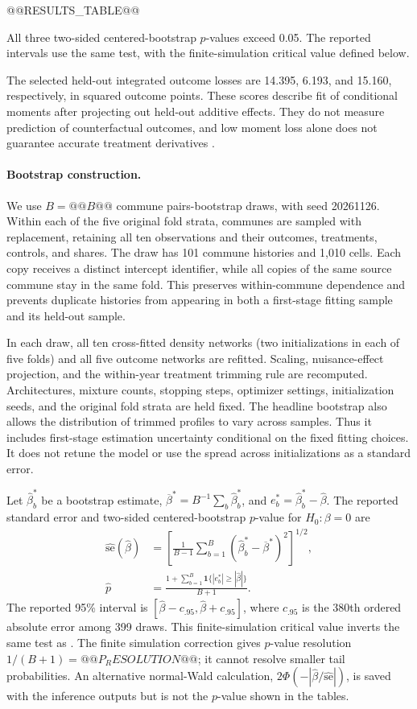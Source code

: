 @@RESULTS_TABLE@@

All three two-sided centered-bootstrap $p$-values exceed 0.05. The reported intervals use the same test, with the finite-simulation critical value defined below.

The selected held-out integrated outcome losses are 14.395, 6.193, and 15.160, respectively, in squared outcome points. These scores describe fit of conditional moments after projecting out held-out additive effects. They do not measure prediction of counterfactual outcomes, and low moment loss alone does not guarantee accurate treatment derivatives \cite[Section 3.2]{deepiv}.

\paragraph{Bootstrap construction.}
We use $B=@@B@@$ commune pairs-bootstrap draws, with seed 20261126. Within each of the five original fold strata, communes are sampled with replacement, retaining all ten observations and their outcomes, treatments, controls, and shares. The draw has 101 commune histories and 1,010 cells. Each copy receives a distinct intercept identifier, while all copies of the same source commune stay in the same fold. This preserves within-commune dependence and prevents duplicate histories from appearing in both a first-stage fitting sample and its held-out sample.

In each draw, all ten cross-fitted density networks (two initializations in each of five folds) and all five outcome networks are refitted. Scaling, nuisance-effect projection, and the within-year treatment trimming rule are recomputed. Architectures, mixture counts, stopping steps, optimizer settings, initialization seeds, and the original fold strata are held fixed. The headline bootstrap also allows the distribution of trimmed profiles to vary across samples. Thus it includes first-stage estimation uncertainty conditional on the fixed fitting choices. It does not retune the model or use the spread across initializations as a standard error.

Let $\widehat\beta_b^*$ be a bootstrap estimate, $\overline\beta^*=B^{-1}\sum_b\widehat\beta_b^*$, and $e_b^*=\widehat\beta_b^*-\widehat\beta$. The reported standard error and two-sided centered-bootstrap $p$-value for $H_0:\beta=0$ are
\begin{align}
\widehat{\mathrm{se}}(\widehat\beta)
&=\left[\frac{1}{B-1}\sum_{b=1}^{B}
(\widehat\beta_b^*-\overline\beta^*)^2\right]^{1/2},\\
\widehat p
&=\frac{1+\sum_{b=1}^{B}\mathbf1\{|e_b^*|\geq|\widehat\beta|\}}{B+1}.
\label{eq:neural-bootstrap-p}
\end{align}
The reported 95\% interval is $[\widehat\beta-c_{.95},\widehat\beta+c_{.95}]$, where $c_{.95}$ is the 380th ordered absolute error among 399 draws. This finite-simulation critical value inverts the same test as .
The finite simulation correction gives $p$-value resolution $1/(B+1)=@@P_RESOLUTION@@$; it cannot resolve smaller tail probabilities. An alternative normal-Wald calculation, $2\Phi(-|\widehat\beta/\widehat{\mathrm{se}}|)$, is saved with the inference outputs but is not the $p$-value shown in the tables.

